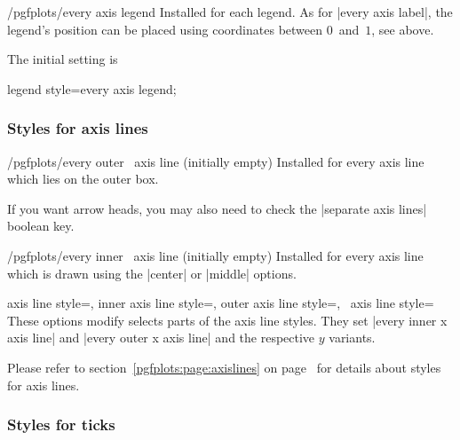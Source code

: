\begin{stylekey}{/pgfplots/every axis legend}
 Installed for each legend. As for |every axis label|, the legend's position can be placed using coordinates between $0$~and~$1$, see above.

 The initial setting is
\begin{codeexample}
\end{codeexample}
\end{stylekey}

\pgfplotsshortstylekey legend style=every axis legend;

\subsubsection*{Styles for axis lines}
\begin{xystylekey}{/pgfplots/every outer \x\ axis line (initially empty)}
	Installed for every axis line which lies on the outer box.

	If you want arrow heads, you may also need to check the |separate axis lines| boolean key.
\end{xystylekey}

\begin{xystylekey}{/pgfplots/every inner \x\ axis line (initially empty)}
	Installed for every axis line which is drawn using the |center| or |middle| options.
\end{xystylekey}

\begin{pgfplotsxykeylist}{%
	axis line style=,
	inner axis line style=,
	outer axis line style=,
	\x\ axis line style=}
	These options modify selects parts of the axis line styles. They set |every inner x axis line| and |every outer x axis line| and the respective $y$ variants.
\end{pgfplotsxykeylist}

\noindent
Please refer to section~\ref{pgfplots:page:axislines} on page~\pageref{pgfplots:page:axislines} for details about styles for axis lines.



\subsubsection*{Styles for ticks}

